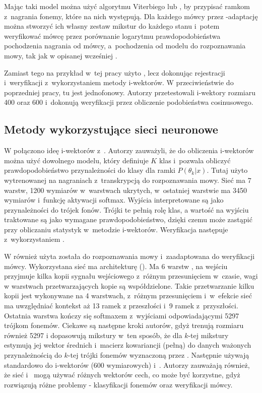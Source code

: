 Mając taki model można użyć algorytmu Viterbiego lub , by przypisać ramkom z~nagrania
fonemy, które na nich występują. Dla każdego mówcy
przez -adaptację można stworzyć ich własny zestaw mikstur do każdego stanu i~potem weryfikować
mówcę przez porównanie logarytmu prawdopodobieństwa
pochodzenia nagrania od mówcy, a~pochodzenia od modelu do rozpoznawania mowy, tak jak
w opisanej wcześniej .

Zamiast tego na przykład w~tej pracy \cite{iVectorHmmBased}
użyto , lecz dokonując rejestracji i~weryfikacji z~wykorzystaniem metody i-wektorów.
W przeciwieństwie do poprzedniej pracy, tu  jest jednofonowy. Autorzy przetestowali
i-wektory rozmiaru 400 oraz 600 i~dokonują weryfikacji przez obliczenie podobieństwa cosinusowego.

\subsection{Metody wykorzystujące sieci neuronowe}

W \cite{aNovelSchemeFor}
połączono ideę i-wektorów z~. Autorzy zauważyli, że do obliczenia i-wektorów można użyć
dowolnego modelu, który definiuje $K$ klas i~pozwala obliczyć prawdopodobieństwo
przynależności do klasy dla ramki $P(\theta_k | x)$.
Tutaj użyto  wytrenowanej na nagraniach z~transkrypcją do rozpoznawania mowy.
Sieć ma 7 warstw, 1200 wymiarów w~warstwach ukrytych, w~ostatniej warstwie ma 3450 wymiarów i~funkcję aktywacji softmax.
Wyjścia interpretowane są jako przynależności do trójek fonów. Trójki te pełnią rolę klas,
a wartość na wyjściu traktowane są jako wymagane prawdopodobieństwo, dzięki czemu 
może zastąpić 
przy obliczaniu statystyk w~metodzie i-wektorów. Weryfikacja następuje z~wykorzystaniem .

W \cite{timeDelayDeep}
również użyta została  do rozpoznawania mowy i~zaadaptowana do weryfikacji mówcy.
Wykorzystana sieć ma architekturę  (). Ma 6 warstw ,
na wejściu przyjmuje kilka kopii sygnału wejściowego z~różnym przesunięciem w~czasie, wagi
w warstwach przetwarzających kopie są współdzielone. Takie przetwarzanie kilku kopii jest wykonywane na
4 warstwach, z~różnym przesunięciem i~w~efekcie sieć ma uwzględniać kontekst aż 13 ramek
z przeszłości i~9 ramek z~przyszłości. Ostatnia warstwa kończy się softmaxem z~wyjściami odpowiadającymi 5297 trójkom fonemów.
Ciekawe są następne kroki autorów, gdyż trenują  rozmiaru również 5297
i dopasowują mikstury w~ten sposób, że dla $k$-tej mikstury estymują jej wektor średnich i~macierz kowariancji (pełną)
do danych ważonych przynależnością do $k$-tej trójki fonemów wyznaczoną przez .
Następnie używają  standardowo do i-wektorów (600 wymiarowych) i~.
Autorzy zauważają również, że sieć i~ mogą używać różnych wektorów cech,
co może być korzystne, gdyż rozwiązują różne problemy - klasyfikacji fonemów oraz weryfikacji mówcy.

